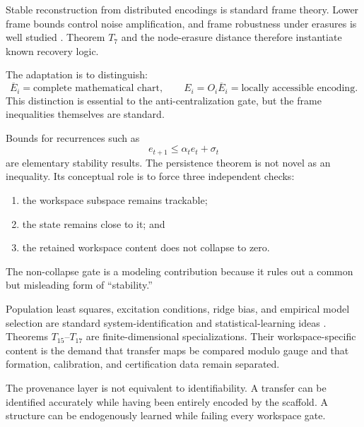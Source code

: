 

Stable reconstruction from distributed encodings is standard frame theory.
Lower frame bounds control noise amplification, and frame robustness under
erasures is well studied \cite{CasazzaKovacevic2003,Christensen2016}. Theorem
\(T_7\) and the node-erasure distance therefore instantiate known recovery
logic.

The adaptation is to distinguish:
\[
\overline E_i
=
\text{complete mathematical chart},
\qquad
E_i=O_i\overline E_i
=
\text{locally accessible encoding}.
\]
This distinction is essential to the anti-centralization gate, but the frame
inequalities themselves are standard.


Bounds for recurrences such as
\[
e_{t+1}\leq\alpha_t e_t+\sigma_t
\]
are elementary stability results. The persistence theorem is not novel as an
inequality. Its conceptual role is to force three independent checks:
\begin{enumerate}
\item the workspace subspace remains trackable;
\item the state remains close to it; and
\item the retained workspace content does not collapse to zero.
\end{enumerate}
The non-collapse gate is a modeling contribution because it rules out a common
but misleading form of ``stability.''


Population least squares, excitation conditions, ridge bias, and empirical
model selection are standard system-identification and statistical-learning
ideas \cite{Ljung1999}. Theorems \(T_{15}\)--\(T_{17}\) are finite-dimensional
specializations. Their workspace-specific content is the demand that transfer
maps be compared modulo gauge and that formation, calibration, and
certification data remain separated.

The provenance layer is not equivalent to identifiability. A transfer can be
identified accurately while having been entirely encoded by the scaffold. A
structure can be endogenously learned while failing every workspace gate.


